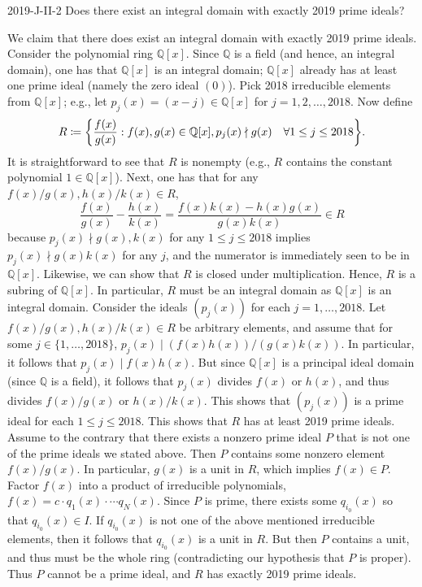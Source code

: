 \documentclass{article}
\begin{document}
	\begin{prb}{2019-J-II-2}
		Does there exist an integral domain with exactly 2019 prime ideals? 
	\end{prb}
	We claim that there does exist an integral domain with exactly 2019 prime ideals. Consider the polynomial ring $\mathbb{Q}[x]$. Since $\mathbb{Q}$ is a field (and hence, an integral domain), one has that $\mathbb{Q}[x]$ is an integral domain; $\mathbb{Q}[x]$ already has at least one prime ideal (namely the zero ideal $(0)$). Pick 2018 irreducible elements from $\mathbb{Q}[x]$; e.g., let $p_{j}(x) = (x - j) \in \mathbb{Q}[x]$ for $j = 1, 2, \ldots, 2018$. Now define 
	\begin{equation*}
		R \coloneqq 
		\brac*{\frac{f(x)}{g(x)} : f(x), g(x)\in \mathbb{Q}[x], p_{j}(x) \nmid g(x) \quad \forall 1 \leq j \leq 2018}. 
	\end{equation*}
	It is straightforward to see that $R$ is nonempty (e.g., $R$ contains the constant polynomial $1 \in \mathbb{Q}[x]$). Next, one has that for any $f(x)/g(x), h(x)/k(x) \in R$, 
	\begin{equation*}
		\frac{f(x)}{g(x)} - \frac{h(x)}{k(x)} = \frac{f(x)k(x) - h(x)g(x)}{g(x)k(x)} \in R
	\end{equation*}
	because $p_{j}(x) \nmid g(x), k(x)$ for any $1 \leq j \leq 2018$ implies $p_{j}(x) \nmid g(x)k(x)$ for any $j$, and the numerator is immediately seen to be in $\mathbb{Q}[x]$. Likewise, we can show that $R$ is closed under multiplication. Hence, $R$ is a subring of $\mathbb{Q}[x]$. In particular, $R$ must be an integral domain as $\mathbb{Q}[x]$ is an integral domain. Consider the ideals $(p_{j}(x))$ for each $j = 1, \ldots, 2018$. Let $f(x)/g(x), h(x)/k(x) \in R$ be arbitrary elements, and assume that for some $j \in \{1, \ldots, 2018\}$, $p_{j}(x) \mid (f(x)h(x))/(g(x)k(x))$. In particular, it follows that $p_{j}(x) \mid f(x)h(x)$. But since $\mathbb{Q}[x]$ is a principal ideal domain (since $\mathbb{Q}$ is a field), it follows that $p_{j}(x)$ divides $f(x)$ or $h(x)$, and thus divides $f(x)/g(x)$ or $h(x)/k(x)$. This shows that $(p_{j}(x))$ is a prime ideal for each $1 \leq j \leq 2018$. This shows that $R$ has at least 2019 prime ideals. Assume to the contrary that there exists a nonzero prime ideal $P$ that is not one of the prime ideals we stated above. Then $P$ contains some nonzero element $f(x)/g(x)$. In particular, $g(x)$ is a unit in $R$, which implies $f(x) \in P$. Factor $f(x)$ into a product of irreducible polynomials, $f(x) = c \cdot q_{1}(x) \cdot \dotsm q_{N}(x)$. Since $P$ is prime, there exists some $q_{i_{0}}(x)$ so that $q_{i_{0}}(x) \in I$. If $q_{i_{0}}(x)$ is not one of the above mentioned irreducible elements, then it follows that $q_{i_{0}}(x)$ is a unit in $R$. But then $P$ contains a unit, and thus must be the whole ring (contradicting our hypothesis that $P$ is proper). Thus $P$ cannot be a prime ideal, and $R$ has exactly 2019 prime ideals.
	
\end{document}
